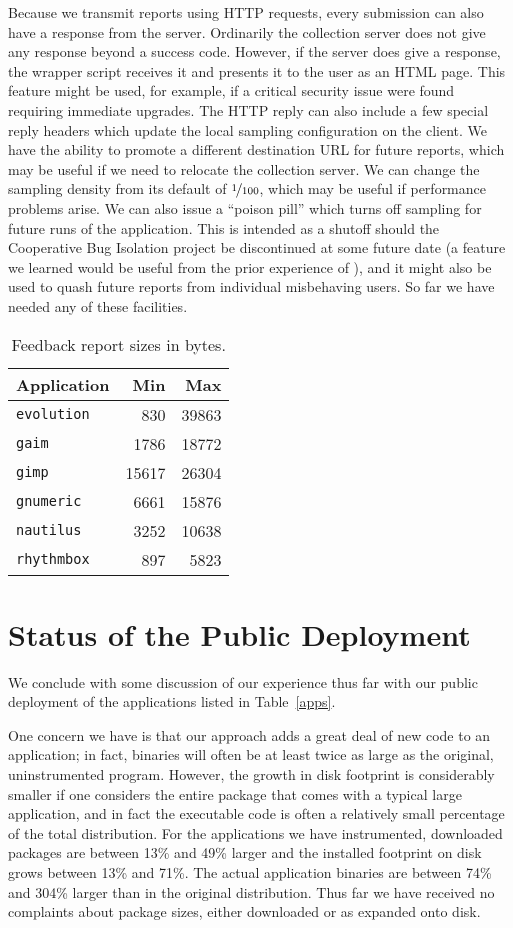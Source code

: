 \documentclass[times,10pt,twocolumn]{article}
\newcommand{\evolution}{\tt evolution}
\newcommand{\gaim}{\tt gaim}
\newcommand{\gimp}{\tt gimp}
\newcommand{\gnumeric}{\tt gnumeric}
\newcommand{\nautilus}{\tt nautilus}
\newcommand{\rhythmbox}{\tt rhythmbox}
\begin{document}
Because we transmit reports using HTTP requests, every submission
can also have a response from the server.
Ordinarily the collection server does not give any response beyond a
success code.  However, if the server does give a response, the
wrapper script receives it and presents it to the user as an HTML
page.  This feature might be used, for example, if a critical security
issue were found requiring immediate upgrades.  
The HTTP reply can also include a few special reply headers which
update the local sampling configuration on the client.  We have the
ability to promote a different destination URL for future reports,
which may be useful if we need to relocate the collection server.  We
can change the sampling density from its default of $\nicefrac{1}{100}$, which may be
useful if performance problems arise.  We can also issue a ``poison
pill'' which turns off sampling for future runs of the application.
This is intended as a shutoff should the Cooperative Bug
Isolation project be discontinued at some future date (a feature we
learned would be useful from the prior experience of \cite{Elbaum:2003:DISATA}), and it might also
be used to quash future reports from individual misbehaving users.  So
far we have needed any of these facilities.  

\begin{table}
  \centering
  \begin{tabular}{lrr}
    Application & Min & Max  \\ \hline
    \evolution & 830 & 39863  \\
    \gaim & 1786 & 18772  \\
    \gimp & 15617 & 26304  \\
    \gnumeric & 6661 & 15876  \\
    \nautilus & 3252 & 10638  \\
    \rhythmbox & 897 & 5823 
  \end{tabular}
  \caption{Feedback report sizes in bytes.}
  \label{report-sizes}
\end{table}

\section{Status of the Public Deployment}

We conclude with some discussion of our experience thus far with our public
deployment of the applications listed in Table~\ref{apps}.

One concern we have is that our approach adds a great deal of new code
to an application; in fact, binaries will often be at least twice as
large as the original, uninstrumented program.  However, the growth in
disk footprint is considerably smaller if one considers the entire
package that comes with a typical large application, and in fact the
executable code is often a relatively small percentage of the total
distribution.  For the applications we have instrumented, downloaded
packages are between 13\% and 49\% larger and the installed footprint
on disk grows between 13\% and 71\%.  The actual application binaries
are between 74\% and 304\% larger than in the original distribution.
Thus far we have received no complaints about package sizes, either
downloaded or as expanded onto disk.
\end{document}
